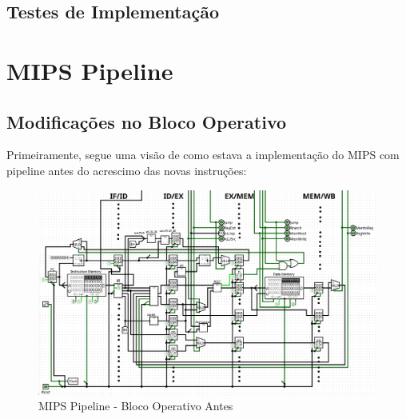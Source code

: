 \documentclass{report}
\let\oldsection\section
\renewcommand\section{\clearpage\oldsection}
\begin{document}
        \subsection{Testes de Implementação}

    \section{MIPS Pipeline}
        \subsection{Modificações no Bloco Operativo}
        Primeiramente, segue uma visão de como estava a implementação do MIPS com pipeline antes
        do acrescimo das novas instruções:
        \begin{figure}[h!]
            \centering
            \includegraphics[width=\linewidth]{images/prints/Pipeline/Bloco Operativo Pipeline Antes.png}
            \caption{\label{print:pipeline_ob_before} MIPS Pipeline - Bloco Operativo Antes}
        \end{figure}
\end{document}
